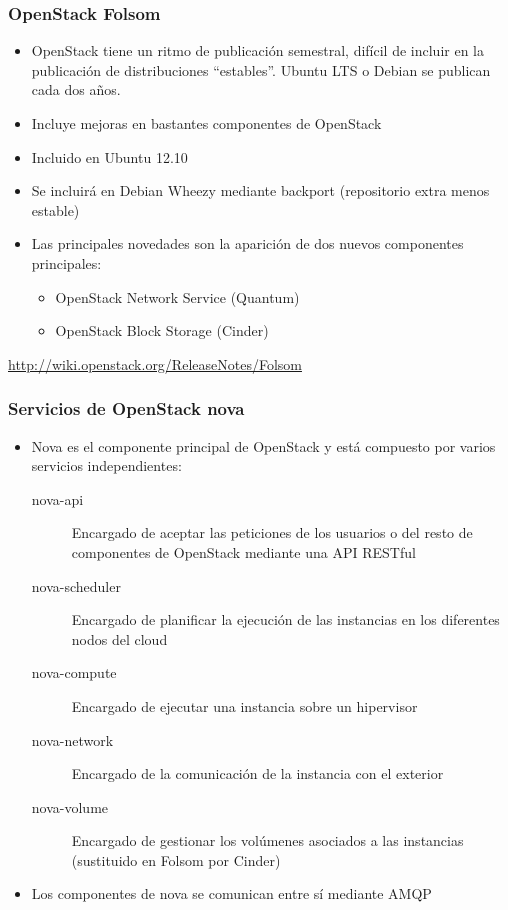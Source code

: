 \documentclass{beamer}
\begin{document}
\begin{frame}
  \frametitle{OpenStack Folsom}
  \begin{itemize}
  \item OpenStack tiene un ritmo de publicación semestral, difícil de incluir en
    la publicación de distribuciones ``estables''. Ubuntu LTS o Debian se
    publican cada dos años.
  \item Incluye mejoras en bastantes componentes de OpenStack
  \item Incluido en Ubuntu 12.10
  \item Se incluirá en Debian Wheezy mediante backport (repositorio extra menos
    estable)
  \item Las principales novedades son la aparición de dos nuevos componentes
    principales:
    \begin{itemize}
    \item OpenStack Network Service (Quantum)
    \item OpenStack Block Storage (Cinder)
    \end{itemize}
  \end{itemize}
  \url{http://wiki.openstack.org/ReleaseNotes/Folsom}
\end{frame}

\begin{frame}
  \frametitle{Servicios de OpenStack nova}
  \begin{itemize}
  \item Nova es el componente principal de OpenStack y está compuesto por varios
    servicios independientes:
    \begin{description}
    \item[nova-api] Encargado de aceptar las peticiones de los usuarios o del
      resto de componentes de OpenStack mediante una API RESTful
    \item[nova-scheduler] Encargado de planificar la ejecución de las instancias
      en los diferentes nodos del cloud
    \item[nova-compute] Encargado de ejecutar una instancia sobre un hipervisor
    \item[nova-network] Encargado de la comunicación de la instancia con el
      exterior
    \item[nova-volume] Encargado de gestionar los volúmenes asociados a las
      instancias (sustituido en Folsom por Cinder)
    \end{description}
  \item Los componentes de nova se comunican entre sí mediante AMQP
  \end{itemize}
\end{frame}
\end{document}
